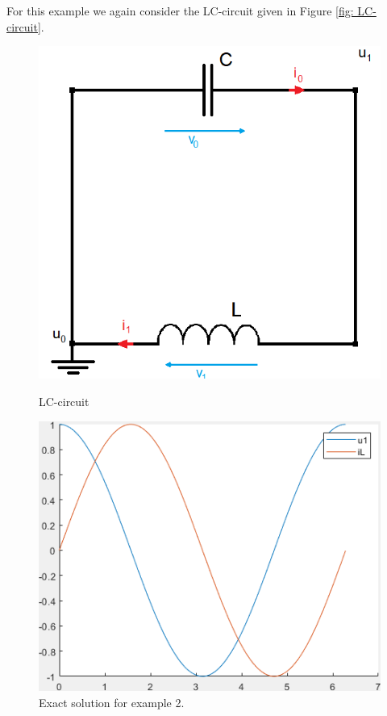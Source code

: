 	
\begin{example2}
	For this example we again consider the LC-circuit given in Figure \ref{fig: LC-circuit}.
	
	\begin{figure}[H]
		\centering
		\begin{minipage}{.5\textwidth}
			\centering
			\includegraphics[width=\linewidth]{pictures/Example2_index0.png}
			\caption{LC-circuit}
			\label{fig: LC-circuit}
		\end{minipage}%
		\begin{minipage}{.5\textwidth}
			\centering
			\includegraphics[width=\linewidth]{pictures/exact_solution_ex2.png}
			\caption{Exact solution for example 2.}
			\label{fig: Exact solution for example 2}
		\end{minipage}
	\end{figure}
	

\end{example2}
